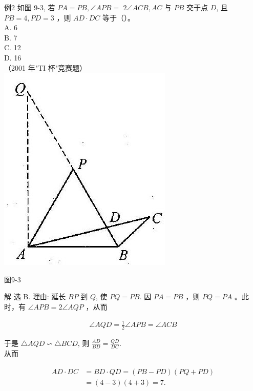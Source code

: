 \documentclass[10pt]{article}
\begin{document}
例2 如图 9-3, 若 $P A=P B, \angle A P B=$ $2 \angle A C B, A C$ 与 $P B$ 交于点 $D$, 且 $P B=4, P D=3$ ，则 $A D \cdot D C$ 等于（）。\\
A. 6\\
B. 7\\
C. 12\\
D. 16\\
（2001 年"TI 杯"竞赛题）\\
\includegraphics[max width=\textwidth, center]{2024_10_30_2c8f45efd4a519b08e1ag-090(2)}

图9-3

解 选 B. 理由: 延长 $B P$ 到 $Q$, 使 $P Q=P B$. 因 $P A=P B$ ，则 $P Q=P A$ 。此时，有 $\angle A P B=2 \angle A Q P$ ，从而

\begin{align*}
\angle A Q D=\frac{1}{2} \angle A P B=\angle A C B
\end{align*}

于是 $\triangle A Q D \backsim \triangle B C D$, 则 $\frac{A D}{B D}=\frac{Q D}{D C}$.\\
从而

\begin{align*}
\begin{aligned}
A D \cdot D C & =B D \cdot Q D=(P B-P D)(P Q+P D) \\
& =(4-3)(4+3)=7 .
\end{aligned}
\end{align*}
\end{document}
